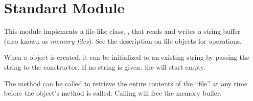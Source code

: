 \section{Standard Module }
\label{module-StringIO}


This module implements a file-like class, ,
that reads and writes a string buffer (also known as {\em memory
files}). See the description on file objects for operations.

When a  object is created, it can be initialized
to an existing string by passing the string to the constructor.
If no string is given, the  will start empty.

The method  can be called to retrieve the entire
contents of the ``file'' at any time before the 
object's  method is called.  Calling  will
free the memory buffer.
